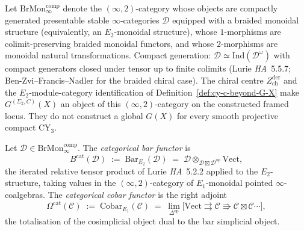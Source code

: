 \begin{definition}
\label{def:cy-c-brmon-comp-infty}
Let $\mathrm{BrMon}^{\mathrm{comp}}_\infty$ denote the $(\infty,2)$-category
whose objects are compactly generated presentable stable $\infty$-categories
$\mathcal D$ equipped with a braided monoidal structure (equivalently, an
$E_2$-monoidal structure), whose $1$-morphisms are colimit-preserving
braided monoidal functors, and whose $2$-morphisms are monoidal natural
transformations. Compact generation: $\mathcal D \simeq \mathrm{Ind}(\mathcal D^{\omega})$
with compact generators closed under tensor up to finite colimits
(Lurie \emph{HA}~5.5.7; Ben-Zvi--Francis--Nadler for the braided chiral case).
The chiral centre $Z^{\mathrm{der}}_{\mathrm{ch}}$ and the $E_2$-module-category
identification of Definition~\ref{def:cy-c-beyond-G-X} make
$G^{(\Sigma_2,C)}(X)$ an object of this $(\infty,2)$-category on the
constructed framed locus. They do not construct a global $G(X)$ for
every smooth projective compact CY$_3$.
\end{definition}

\begin{definition}
\label{def:cy-c-cat-bar-cobar}
Let $\mathcal D \in \mathrm{BrMon}^{\mathrm{comp}}_\infty$. The
\emph{categorical bar functor} is
\[
 B^{\mathrm{cat}}(\mathcal D)
 \;:=\;
 \mathrm{Bar}_{E_2}(\mathcal D)
 \;=\;
 \mathcal D \otimes_{\mathcal D \boxtimes \mathcal D^{\mathrm{op}}} \mathrm{Vect},
\]
the iterated relative tensor product of Lurie \emph{HA}~5.2.2 applied to
the $E_2$-structure, taking values in the $(\infty,2)$-category of
$E_1$-monoidal pointed $\infty$-coalgebras. The \emph{categorical cobar
functor} is the right adjoint
\[
 \Omega^{\mathrm{cat}}(\mathcal C)
 \;:=\;
 \mathrm{Cobar}_{E_1}(\mathcal C)
 \;=\;
 \lim_{\Delta^{\mathrm{op}}}
 \bigl[ \mathrm{Vect} \rightrightarrows \mathcal C \Rrightarrow
 \mathcal C \boxtimes \mathcal C \cdots \bigr],
\]
the totalisation of the cosimplicial object dual to the bar simplicial
object.
\end{definition}

